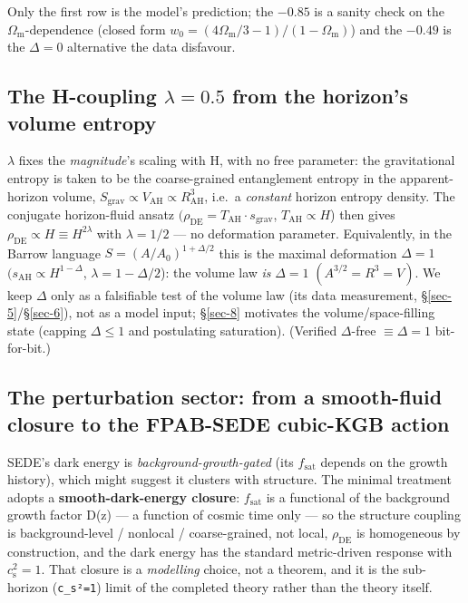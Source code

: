 \documentclass[preprint,12pt]{elsarticle}
\begin{document}
Only the first row is the model's prediction; the \(-0.85\) is a sanity
check on the \(\Omega _{\mathrm{m}}\)-dependence (closed form
\(w_{0} = (4\Omega _{\mathrm{m}}/3 - 1)/(1 - \Omega _{\mathrm{m}})\))
and the \(-0.49\) is the \(\Delta =0\) alternative the data disfavour.

\subsection{\texorpdfstring{The H-coupling \(\lambda  = 0.5\) from the
horizon's volume
entropy}{The H-coupling \textbackslash lambda  = 0.5 from the horizon's volume entropy}}\label{sec-3-3}

\(\lambda\) fixes the \emph{magnitude}'s scaling with H, with no free
parameter: the gravitational entropy is taken to be the coarse-grained
entanglement entropy in the apparent-horizon volume,
\(S_{\mathrm{grav}} \propto  V_\mathrm{AH} \propto  R_\mathrm{AH}^{3}\),
i.e.~a \emph{constant} horizon entropy density. The conjugate
horizon-fluid ansatz
\((\rho _\mathrm{DE} = T_\mathrm{AH}\cdot s_{\mathrm{grav}}\),
\(T_\mathrm{AH} \propto  H\)) then gives
\(\rho _\mathrm{DE} \propto  H \equiv  H^{2\lambda }\) with
\(\lambda  = 1/2\) --- no deformation parameter. Equivalently, in the
Barrow language \(S = (A/A_{0})^{1+\Delta /2}\) this is the maximal
deformation \(\Delta  = 1\) \((s_\mathrm{AH} \propto  H^{1-\Delta }\),
\(\lambda  = 1-\Delta /2\)): the volume law \emph{is} \(\Delta =1\)
\((A^{3/2} = R^{3} = V)\). We keep \(\Delta\) only as a falsifiable test
of the volume law (its data measurement, §\ref{sec-5}/§\ref{sec-6}), not
as a model input; §\ref{sec-8} motivates the volume/space-filling state
(capping \(\Delta \leq 1\) and postulating saturation). (Verified
\(\Delta\)-free \(\equiv  \Delta =1\) bit-for-bit.)

\subsection{The perturbation sector: from a smooth-fluid closure to the
FPAB-SEDE cubic-KGB action}\label{sec-3-4}

SEDE's dark energy is \emph{background-growth-gated} (its
\(f_{\mathrm{sat}}\) depends on the growth history), which might suggest
it clusters with structure. The minimal treatment adopts a
\textbf{smooth-dark-energy closure}: \(f_{\mathrm{sat}}\) is a
functional of the background growth factor D(z) --- a function of cosmic
time only --- so the structure coupling is background-level / nonlocal /
coarse-grained, not local, \(\rho _\mathrm{DE}\) is homogeneous by
construction, and the dark energy has the standard metric-driven
response with \(c_{\mathrm{s}}^{2} = 1\). That closure is a
\emph{modelling} choice, not a theorem, and it is the sub-horizon
(\texttt{c\_\allowbreak s²=1}) limit of the completed theory rather than the theory
itself.
\end{document}
